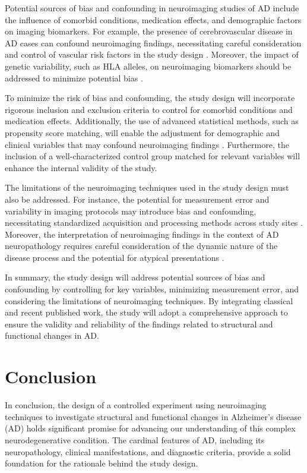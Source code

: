 \documentclass[10pt]{article}
\begin{document}
\begin{sloppypar}
  Potential sources of bias and confounding in neuroimaging studies of AD include the influence of comorbid conditions, medication effects, and demographic factors on imaging biomarkers. For example, the presence of cerebrovascular disease in AD cases can confound neuroimaging findings, necessitating careful consideration and control of vascular risk factors in the study design . Moreover, the impact of genetic variability, such as HLA alleles, on neuroimaging biomarkers should be addressed to minimize potential bias .

  To minimize the risk of bias and confounding, the study design will incorporate rigorous inclusion and exclusion criteria to control for comorbid conditions and medication effects. Additionally, the use of advanced statistical methods, such as propensity score matching, will enable the adjustment for demographic and clinical variables that may confound neuroimaging findings . Furthermore, the inclusion of a well-characterized control group matched for relevant variables will enhance the internal validity of the study.

  The limitations of the neuroimaging techniques used in the study design must also be addressed. For instance, the potential for measurement error and variability in imaging protocols may introduce bias and confounding, necessitating standardized acquisition and processing methods across study sites . Moreover, the interpretation of neuroimaging findings in the context of AD neuropathology requires careful consideration of the dynamic nature of the disease process and the potential for atypical presentations .

  In summary, the study design will address potential sources of bias and confounding by controlling for key variables, minimizing measurement error, and considering the limitations of neuroimaging techniques. By integrating classical and recent published work, the study will adopt a comprehensive approach to ensure the validity and reliability of the findings related to structural and functional changes in AD.

  \section{Conclusion}
  \label{sec:conclusion}

  In conclusion, the design of a controlled experiment using neuroimaging techniques to investigate structural and functional changes in Alzheimer's disease (AD) holds significant promise for advancing our understanding of this complex neurodegenerative condition. The cardinal features of AD, including its neuropathology, clinical manifestations, and diagnostic criteria, provide a solid foundation for the rationale behind the study design.


\end{sloppypar}
\end{document}
